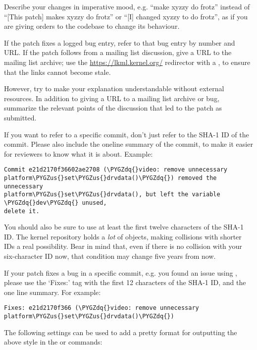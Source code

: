 \documentclass[a4paper,8pt,english]{sphinxmanual}
\def\PYGZus{\char`\_}
\def\PYGZdq{\char`\"}
\begin{document}
Describe your changes in imperative mood, e.g. ``make xyzzy do frotz''
instead of ``{[}This patch{]} makes xyzzy do frotz'' or ``{[}I{]} changed xyzzy
to do frotz'', as if you are giving orders to the codebase to change
its behaviour.

If the patch fixes a logged bug entry, refer to that bug entry by
number and URL.  If the patch follows from a mailing list discussion,
give a URL to the mailing list archive; use the \href{https://lkml.kernel.org/}{https://lkml.kernel.org/}
redirector with a , to ensure that the links cannot become
stale.

However, try to make your explanation understandable without external
resources.  In addition to giving a URL to a mailing list archive or
bug, summarize the relevant points of the discussion that led to the
patch as submitted.

If you want to refer to a specific commit, don't just refer to the
SHA-1 ID of the commit. Please also include the oneline summary of
the commit, to make it easier for reviewers to know what it is about.
Example:

\begin{Verbatim}[commandchars=\\\{\}]
Commit e21d2170f36602ae2708 (\PYGZdq{}video: remove unnecessary
platform\PYGZus{}set\PYGZus{}drvdata()\PYGZdq{}) removed the unnecessary
platform\PYGZus{}set\PYGZus{}drvdata(), but left the variable \PYGZdq{}dev\PYGZdq{} unused,
delete it.
\end{Verbatim}

You should also be sure to use at least the first twelve characters of the
SHA-1 ID.  The kernel repository holds a \emph{lot} of objects, making
collisions with shorter IDs a real possibility.  Bear in mind that, even if
there is no collision with your six-character ID now, that condition may
change five years from now.

If your patch fixes a bug in a specific commit, e.g. you found an issue using
, please use the `Fixes:' tag with the first 12 characters of
the SHA-1 ID, and the one line summary.  For example:

\begin{Verbatim}[commandchars=\\\{\}]
Fixes: e21d2170f366 (\PYGZdq{}video: remove unnecessary platform\PYGZus{}set\PYGZus{}drvdata()\PYGZdq{})
\end{Verbatim}

The following  settings can be used to add a pretty format for
outputting the above style in the  or  commands:
\end{document}
